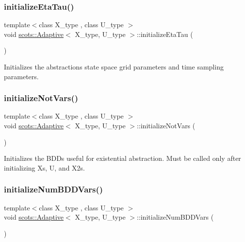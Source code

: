 \subsubsection{\texorpdfstring{initialize\+Eta\+Tau()}{initializeEtaTau()}}
{\footnotesize\ttfamily template$<$class X\+\_\+type , class U\+\_\+type $>$ \\
void \hyperlink{classscots_1_1Adaptive}{scots\+::\+Adaptive}$<$ X\+\_\+type, U\+\_\+type $>$\+::initialize\+Eta\+Tau (\begin{DoxyParamCaption}{ }\end{DoxyParamCaption})\hspace{0.3cm}{\ttfamily [inline]}}

Initializes the abstractions\textquotesingle{} state space grid parameters and time sampling parameters. \mbox{\label{classscots_1_1Adaptive_a6a9af6f25e8c4015ceb24d704da26972}} 
\subsubsection{\texorpdfstring{initialize\+Not\+Vars()}{initializeNotVars()}}
{\footnotesize\ttfamily template$<$class X\+\_\+type , class U\+\_\+type $>$ \\
void \hyperlink{classscots_1_1Adaptive}{scots\+::\+Adaptive}$<$ X\+\_\+type, U\+\_\+type $>$\+::initialize\+Not\+Vars (\begin{DoxyParamCaption}{ }\end{DoxyParamCaption})\hspace{0.3cm}{\ttfamily [inline]}}

Initializes the B\+D\+Ds useful for existential abstraction. Must be called only after initializing Xs, U, and X2s. \mbox{\label{classscots_1_1Adaptive_ab75f4bbed30ecc70747185f36fcab200}} 
\subsubsection{\texorpdfstring{initialize\+Num\+B\+D\+D\+Vars()}{initializeNumBDDVars()}}
{\footnotesize\ttfamily template$<$class X\+\_\+type , class U\+\_\+type $>$ \\
void \hyperlink{classscots_1_1Adaptive}{scots\+::\+Adaptive}$<$ X\+\_\+type, U\+\_\+type $>$\+::initialize\+Num\+B\+D\+D\+Vars (\begin{DoxyParamCaption}{ }\end{DoxyParamCaption})\hspace{0.3cm}{\ttfamily [inline]}}

